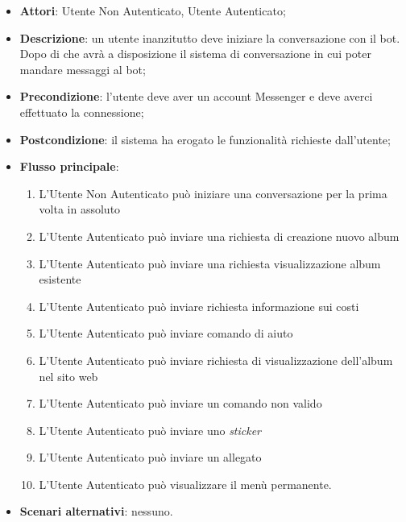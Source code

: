 \begin{itemize}
  \item \textbf{Attori}: Utente Non Autenticato, Utente Autenticato;
  \item \textbf{Descrizione}: un utente inanzitutto deve iniziare la
conversazione con il bot. Dopo di che avrà a disposizione il sistema di
conversazione in cui poter mandare messaggi al bot;
  \item \textbf{Precondizione}: l'utente deve aver un account Messenger e deve
averci effettuato la connessione;
  \item \textbf{Postcondizione}: il sistema ha erogato le funzionalità
richieste dall'utente;
  \item \textbf{Flusso principale}:
  \begin{enumerate}
    \item L'Utente Non Autenticato può iniziare una conversazione per la prima
volta in assoluto
    \item L'Utente Autenticato può inviare una richiesta di creazione nuovo
album %
    \item L'Utente Autenticato può inviare una richiesta visualizzazione album
esistente
    \item L'Utente Autenticato può inviare richiesta informazione sui costi
    \item L'Utente Autenticato può inviare comando di aiuto
    \item L'Utente Autenticato può inviare richiesta di visualizzazione
dell'album nel sito web
    \item L'Utente Autenticato può inviare un comando non valido
    \item L'Utente Autenticato può inviare uno \textit{sticker}
    \item L'Utente Autenticato può inviare un allegato %
    \item L'Utente Autenticato può visualizzare il menù permanente.
  \end{enumerate}
  \item \textbf{Scenari alternativi}: nessuno.
\end{itemize}
